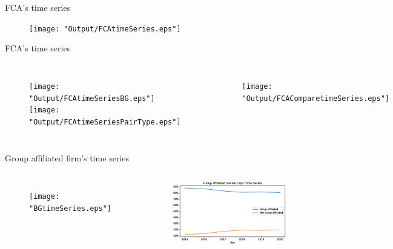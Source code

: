 \documentclass{beamer}
\begin{document}
	\begin{frame}{FCA's time series}
		\begin{figure}
			\centering  
			\texttt{[image: "Output/FCAtimeSeries.eps"]}
			
		\end{figure} 
	\end{frame}

	\begin{frame}{FCA's time series}
		\begin{columns}
			\begin{figure}
				\centering  
				\texttt{[image: "Output/FCAtimeSeriesBG.eps"]}
				\texttt{[image: "Output/FCAtimeSeriesPairType.eps"]}
			\end{figure}    
			\begin{figure}
				\centering  
				\texttt{[image: "Output/FCAComparetimeSeries.eps"]}
			\end{figure}
          
		\end{columns}

\end{frame}

	\begin{frame}{Group affiliated firm's time series}
		\begin{columns}
	\begin{figure}
	\centering  
	\texttt{[image: "BGtimeSeries.eps"]}
	
\end{figure}  
	\column{.5\textwidth}
	\begin{figure}
	\centering  
	\includegraphics[width=\linewidth]{"BGMarketCaptimeSeries.eps"}
	
\end{figure} 
	
\end{columns}
\end{frame}
\end{document}
